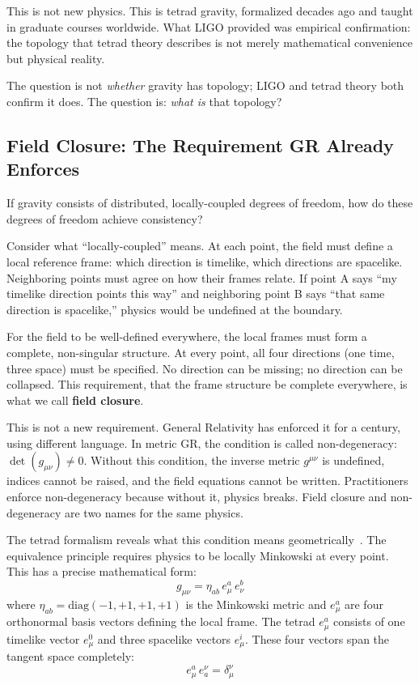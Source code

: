 \documentclass[aps,prd,preprint,superscriptaddress,showpacs,preprintnumbers,amsmath,amssymb,nofootinbib]{revtex4-2}
\begin{document}
This is not new physics. This is tetrad gravity, formalized decades ago and taught in graduate courses worldwide. What LIGO provided was empirical confirmation: the topology that tetrad theory describes is not merely mathematical convenience but physical reality.

The question is not \emph{whether} gravity has topology; LIGO and tetrad theory both confirm it does. The question is: \emph{what is} that topology?

\subsection{Field Closure: The Requirement GR Already Enforces}
\label{subsec:closure}

If gravity consists of distributed, locally-coupled degrees of freedom, how do these degrees of freedom achieve consistency?

Consider what ``locally-coupled'' means. At each point, the field must define a local reference frame: which direction is timelike, which directions are spacelike. Neighboring points must agree on how their frames relate. If point A says ``my timelike direction points this way'' and neighboring point B says ``that same direction is spacelike,'' physics would be undefined at the boundary.

For the field to be well-defined everywhere, the local frames must form a complete, non-singular structure. At every point, all four directions (one time, three space) must be specified. No direction can be missing; no direction can be collapsed. This requirement, that the frame structure be complete everywhere, is what we call \textbf{field closure}.

This is not a new requirement. General Relativity has enforced it for a century, using different language. In metric GR, the condition is called non-degeneracy: $\det(g_{\mu\nu}) \neq 0$. Without this condition, the inverse metric $g^{\mu\nu}$ is undefined, indices cannot be raised, and the field equations cannot be written. Practitioners enforce non-degeneracy because without it, physics breaks. Field closure and non-degeneracy are two names for the same physics.

The tetrad formalism reveals what this condition means geometrically~\cite{mtw1973,wald1984}. The equivalence principle requires physics to be locally Minkowski at every point. This has a precise mathematical form:
\begin{equation}
g_{\mu\nu} = \eta_{ab}\, e^a_\mu\, e^b_\nu
\label{eq:tetrad}
\end{equation}
where $\eta_{ab} = \text{diag}(-1, +1, +1, +1)$ is the Minkowski metric and $e^a_\mu$ are four orthonormal basis vectors defining the local frame. The tetrad $e^a_\mu$ consists of one timelike vector $e^0_\mu$ and three spacelike vectors $e^i_\mu$. These four vectors span the tangent space completely:
\begin{equation}
e^a_\mu\, e_a^\nu = \delta_\mu^\nu
\end{equation}
\end{document}
